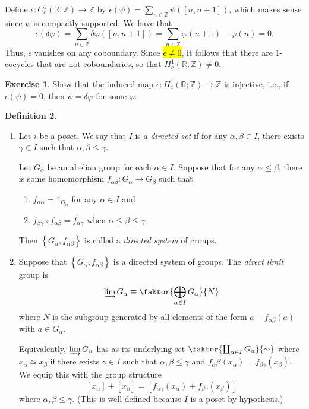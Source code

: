 \documentclass[10pt,letterpaper,cm]{nupset}
\theoremstyle{definition}
\newtheorem{definition}{Definition}[subsection]
\theoremstyle{theorem}
\newtheorem{exercise}[definition]{Exercise}
\theoremstyle{remark}
\newcommand{\R}{\mathbb{R}}
\newcommand{\Z}{\mathbb Z}
\newcommand{\1}{\mathbb{1}}
\newcommand{\0}{\vec 0}
\begin{document}
Define $\epsilon : C_c^1(\R; \Z) \to \Z$ by $ \epsilon(\psi) = \sum_{n\in \Z}\psi([n , n+1])$, which makes sense since $\psi$ is compactly supported. We have that $$\epsilon(\delta{\varphi}) = \sum_{n\in \Z} \delta{\varphi}([n, n+1]) = \sum_{n\in \Z} \varphi(n+1) - \varphi(n) =0.$$ Thus, $\epsilon$ vanishes on any coboundary. Since \hl{$\epsilon \ne 0$}, it follows that there are $1$-cocycles that are not coboundaries, so that $H_c^1(\R; \Z) \ne 0$. 

\begin{exercise}
Show that the induced map $\epsilon: H_c^1(\R; \Z) \to \Z$ is injective, i.e., if $\epsilon(\psi) =0$, then $\psi= \delta{\varphi}$ for some $\varphi$.
\end{exercise}


\begin{definition} $ $
\begin{enumerate}
\item Let $i$ be a poset. We say that $I$ is a \textit{directed set} if for any $\alpha, \beta \in I$, there exists $\gamma \in I$ such that $\alpha, \beta \leq \gamma$. 

Let $G_{\alpha}$ be an abelian group for each $\alpha \in I$. Suppose that for any $\alpha \leq \beta$, there is some homomorphism $f_{\alpha{\beta}} : G_{\alpha} \to G_{\beta}$ such that 
\begin{enumerate}[label=(\roman*)]
\item $f_{\alpha{\alpha}} = \1_{G_{\alpha}}$ for any $\alpha \in I$ and 
\item $f_{\beta{\gamma}}\circ f_{\alpha{\beta}} = f_{\alpha{\gamma}}$ when $\alpha \leq \beta \leq \gamma$. 
\end{enumerate}
Then $\left\{G_{\alpha}, f_{\alpha{\beta}}\right\}$ is called a \textit{directed system} of groups. 
\item Suppose that $\left\{G_{\alpha},  f_{\alpha{\beta}}\right\}$ is a directed system of groups. The \textit{direct limit} group is $$\varinjlim G_{\alpha} \equiv \faktor{\bigoplus_{\alpha \in I}G_{\alpha}}{N}$$ where $N$ is the subgroup generated by all elements of the form $a-f_{\alpha{\beta}}(a)$ with $a\in G_{\alpha}$. 

Equivalently, $\varinjlim G_{\alpha}$ has as its underlying set $\faktor{\coprod_{\alpha \in I} G_{\alpha}}{\sim}$ where $x_{\alpha} \simeq x_{\beta}$ if there exists $\gamma \in I$ such that $\alpha, \beta \leq \gamma$ and $f_{\alpha}{\beta}(x_{\alpha}) = f_{\beta{\gamma}}(x_{\beta})$. We equip this with the group structure $$[x_{\alpha}] +[x_{\beta}] = \left[f_{\alpha{\gamma}}(x_{\alpha}) + f_{\beta{\gamma}}(x_{\beta})\right]$$ where $\alpha, \beta \leq \gamma$. (This is well-defined because $I$ is a poset by hypothesis.)
\end{enumerate}
\end{definition}
\end{document}
